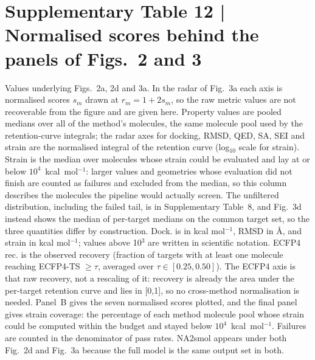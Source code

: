 \section*{Supplementary Table 12 | Normalised scores behind the panels of Figs.~2 and 3}
Values underlying Figs.~2a, 2d and 3a. In the radar of Fig.~3a each axis is normalised scores $s_m$ drawn at $r_m = 1 + 2s_m$, so the raw metric values are not recoverable from the figure and are given here. Property values are pooled medians over all of the method's molecules, the same molecule pool used by the retention-curve integrals; the radar axes for docking, RMSD, QED, SA, SEI and strain are the normalised integral of the retention curve (log$_{10}$ scale for strain). Strain is the median over molecules whose strain could be evaluated and lay at or below $10^{4}$~kcal~mol$^{-1}$: larger values and geometries whose evaluation did not finish are counted as failures and excluded from the median, so this column describes the molecules the pipeline would actually screen. The unfiltered distribution, including the failed tail, is in Supplementary Table~8, and Fig.~3d instead shows the median of per-target medians on the common target set, so the three quantities differ by construction. Dock. is in kcal mol$^{-1}$, RMSD in \AA, and strain in kcal mol$^{-1}$; values above 10$^3$ are written in scientific notation. ECFP4 rec. is the observed recovery (fraction of targets with at least one molecule reaching ECFP4-TS $\geq\tau$, averaged over $\tau \in [0.25,0.50]$). The ECFP4 axis is that raw recovery, not a rescaling of it: recovery is already the area under the per-target retention curve and lies in [0,1], so no cross-method normalisation is needed. Panel~B gives the seven normalised scores plotted, and the final panel gives strain coverage: the percentage of each method molecule pool whose strain could be computed within the budget and stayed below $10^{4}$~kcal~mol$^{-1}$. Failures are counted in the denominator of pass rates. NA2smol appears under both Fig.~2d and Fig.~3a because the full model is the same output set in both.

\bigskip

